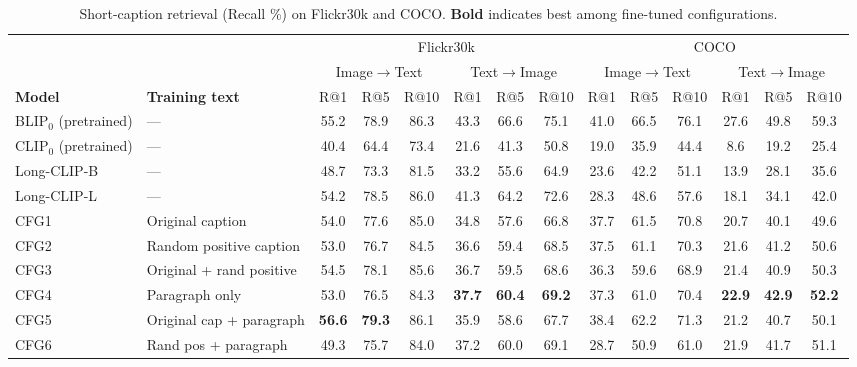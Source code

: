 \begin{table}[t]
\centering
\caption{Short-caption retrieval (Recall \%) on Flickr30k and COCO. \textbf{Bold} indicates best among fine-tuned configurations.}
\label{tab:short_caption}
\small
\setlength{\tabcolsep}{3.5pt}
\begin{adjustbox}{max width=\textwidth}
\begin{tabular}{llcccccccccccc}
\toprule
 &  & \multicolumn{6}{c}{Flickr30k} & \multicolumn{6}{c}{COCO} \\
\cmidrule(lr){3-8}
\cmidrule(lr){9-14}
 &  & \multicolumn{3}{c}{Image$\to$Text} & \multicolumn{3}{c}{Text$\to$Image} & \multicolumn{3}{c}{Image$\to$Text} & \multicolumn{3}{c}{Text$\to$Image} \\
\cmidrule(lr){3-5}
\cmidrule(lr){6-8}
\cmidrule(lr){9-11}
\cmidrule(lr){12-14}
\textbf{Model} & \textbf{Training text} & R@1 & R@5 & R@10 & R@1 & R@5 & R@10 & R@1 & R@5 & R@10 & R@1 & R@5 & R@10 \\
\midrule
BLIP$_0$ (pretrained) & --- & 55.2 & 78.9 & 86.3 & 43.3 & 66.6 & 75.1 & 41.0 & 66.5 & 76.1 & 27.6 & 49.8 & 59.3 \\
CLIP$_0$ (pretrained) & --- & 40.4 & 64.4 & 73.4 & 21.6 & 41.3 & 50.8 & 19.0 & 35.9 & 44.4 & 8.6 & 19.2 & 25.4 \\
Long-CLIP-B & --- & 48.7 & 73.3 & 81.5 & 33.2 & 55.6 & 64.9 & 23.6 & 42.2 & 51.1 & 13.9 & 28.1 & 35.6 \\
Long-CLIP-L & --- & 54.2 & 78.5 & 86.0 & 41.3 & 64.2 & 72.6 & 28.3 & 48.6 & 57.6 & 18.1 & 34.1 & 42.0 \\
\midrule
CFG1 & Original caption & 54.0 & 77.6 & 85.0 & 34.8 & 57.6 & 66.8 & 37.7 & 61.5 & 70.8 & 20.7 & 40.1 & 49.6 \\
CFG2 & Random positive caption & 53.0 & 76.7 & 84.5 & 36.6 & 59.4 & 68.5 & 37.5 & 61.1 & 70.3 & 21.6 & 41.2 & 50.6 \\
CFG3 & Original + rand positive & 54.5 & 78.1 & 85.6 & 36.7 & 59.5 & 68.6 & 36.3 & 59.6 & 68.9 & 21.4 & 40.9 & 50.3 \\
CFG4 & Paragraph only & 53.0 & 76.5 & 84.3 & \textbf{37.7} & \textbf{60.4} & \textbf{69.2} & 37.3 & 61.0 & 70.4 & \textbf{22.9} & \textbf{42.9} & \textbf{52.2} \\
CFG5 & Original cap + paragraph & \textbf{56.6} & \textbf{79.3} & 86.1 & 35.9 & 58.6 & 67.7 & 38.4 & 62.2 & 71.3 & 21.2 & 40.7 & 50.1 \\
CFG6 & Rand pos + paragraph & 49.3 & 75.7 & 84.0 & 37.2 & 60.0 & 69.1 & 28.7 & 50.9 & 61.0 & 21.9 & 41.7 & 51.1 \\

\end{tabular}
\end{adjustbox}
\end{table}
